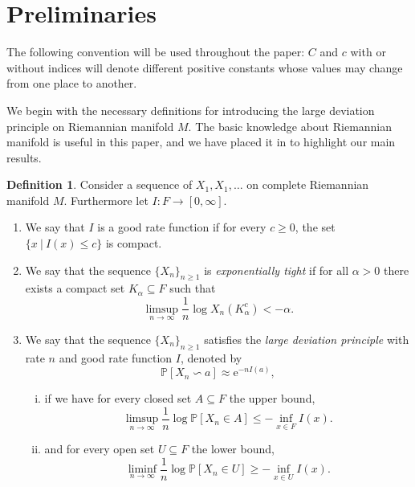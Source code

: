 \documentclass[a4paper]{article}
\numberwithin{equation}{section}
\theoremstyle{definition}
\newtheorem{definition}[theorem]{Definition}
\begin{document}
\section{Preliminaries}\label{sec_statement_main_result}
The following convention will be used throughout the paper: $C$ and $c$ with or without indices will denote diﬀerent positive constants whose values may change from one place to another.
\par
We begin with the necessary definitions for introducing the large deviation principle on Riemannian manifold $M$. The basic knowledge about Riemannian manifold is useful in this paper, and we have placed it in  to highlight our main results.
\begin{definition}
    Consider a sequence of $X_1,X_1,\ldots$ on complete Riemannian manifold $M$. Furthermore let $I: F\to [0,\infty]$.
    \begin{enumerate}
    \item We say that $I$ is a good rate function if for every $c\geq 0$, the set $\{x~|~I(x)\leq c\}$ is compact.
        \item We say that the sequence $\{X_n\}_{n\geq 1}$ is \textit{exponentially tight} if for all $\alpha>0$ there exists a compact set $K_\alpha \subseteq F $ such that 
        \begin{equation*}
            \limsup_{n\to \infty}\frac{1}{n}\log X_n(K^c_\alpha)<-\alpha.
        \end{equation*}
        \item We say that the sequence $\{X_n\}_{n\geq 1}$ satisfies the \textit{large deviation principle} with rate $n$ and good rate function $I$, denoted by
        \begin{equation}
            \mathbb{P}[X_n \backsim a]\approx \mathrm{e}^{-nI(a)},
        \end{equation}
        \begin{enumerate}[(i)]
        \item if we have for every closed set $A\subseteq F$ the upper bound,
            \begin{equation*}
                \limsup_{n\to \infty} \frac{1}{n}\log\mathbb{P}[X_n\in A]\leq -\inf_{x \in F}I(x).
            \end{equation*}
                \item and for every open set $U\subseteq F$ the lower bound,
            \begin{equation*}
                \liminf_{n\to \infty}\frac{1}{n}\log \mathbb{P}[X_n\in U]\geq -\inf_{x\in U}I(x).
            \end{equation*}
            \end{enumerate}
            \end{enumerate}
\end{definition}
\end{document}
